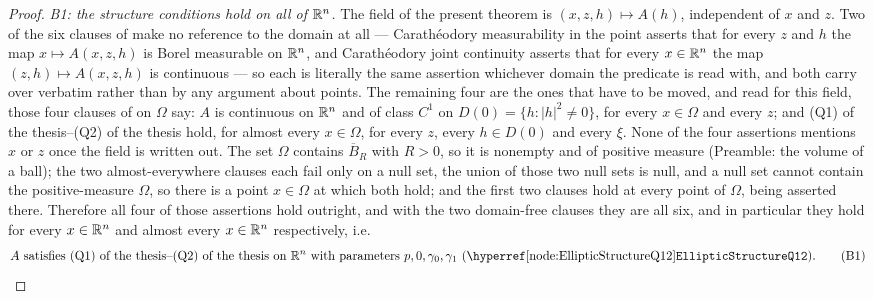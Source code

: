 \begin{proof}
\emph{B1: the structure conditions hold on all of $\mathbb{R}^n$.}  The field of the
present theorem is $(x,z,h)\mapsto A(h)$, independent of $x$ and $z$.
Two of the six clauses of  make no reference to
the domain at all --- Carath\'eodory measurability in the point asserts that for
every $z$ and $h$ the map $x\mapsto A(x,z,h)$ is Borel measurable on $\mathbb{R}^n$, and
Carath\'eodory joint continuity asserts that for every $x\in\mathbb{R}^n$ the map
$(z,h)\mapsto A(x,z,h)$ is continuous --- so each is literally the same
assertion whichever domain the predicate is read with, and both carry over
verbatim rather than by any argument about points.  The remaining four are the ones that have to be moved, and read
for this field, those four clauses of  on $\Omega$ say:
$A$ is continuous on $\mathbb{R}^n$ and of class $C^1$ on
$D(0)=\{h:|h|^2\ne0\}$, for every $x\in\Omega$ and every $z$; and
(Q1) of the thesis--(Q2) of the thesis hold, for almost every $x\in\Omega$, for every $z$,
every $h\in D(0)$ and every $\xi$.  None of the four assertions mentions $x$ or
$z$ once the field is written out.  The set $\Omega$ contains $\overline B_R$
with $R>0$, so it is nonempty and of positive measure (Preamble: the volume of
a ball); the two almost-everywhere clauses each fail only on a null set, the
union of those two null sets is null, and a null set cannot contain the
positive-measure $\Omega$, so there is a point $x\in\Omega$ at which both hold;
and the first two clauses hold at every point of $\Omega$, being asserted
there.  Therefore all four of those assertions hold
outright, and with the two domain-free clauses they are all six, and in particular they hold for every $x\in\mathbb{R}^n$ and almost every
$x\in\mathbb{R}^n$ respectively, i.e.
\[
\text{$A$ satisfies (Q1) of the thesis--(Q2) of the thesis on $\R^n$ with parameters
$p,0,\gamma_0,\gamma_1$ (\noderef{EllipticStructureQ12}).}
\tag{B1}
\]


\end{proof}
